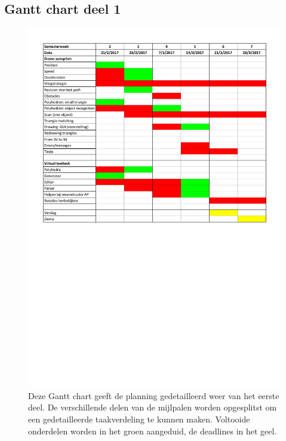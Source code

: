 \subsection{Gantt chart deel 1} 
	\begin{figure}[H]
		\begin{center}
			\includegraphics[scale=0.60]{Appendices/Planning_Deel1.pdf}
		\end{center}
		\caption{Deze Gantt chart geeft de planning gedetailleerd weer van het eerste deel. De verschillende delen van de mijlpalen worden opgesplitst om een gedetailleerde taakverdeling te kunnen maken. Voltooide onderdelen worden in het groen aangeduid, de deadlines in het geel.}
	\end{figure}
